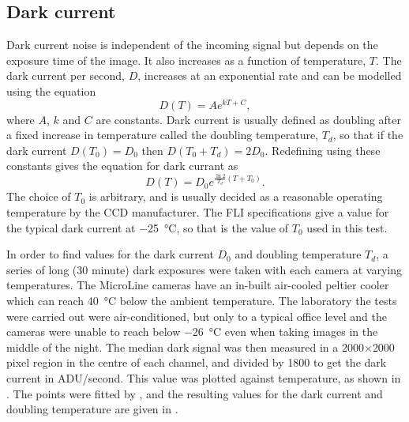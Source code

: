 \subsection{Dark current}
\label{sec:dc}
\begin{colsection}

Dark current noise is independent of the incoming signal but depends on the exposure time of the image. It also increases as a function of temperature, $T$. The dark current per second, $D$, increases at an exponential rate and can be modelled using the equation
%
\begin{equation}
    D(T) = Ae^{kT + C},
    \label{eq:dark_model}
\end{equation}
%
where $A$, $k$ and $C$ are constants. Dark current is usually defined as doubling after a fixed increase in temperature called the doubling temperature, $T_d$, so that if the dark current $D(T_0) = D_0$ then $D(T_0 + T_d) = 2D_0$. Redefining  using these constants gives the equation for dark currant as
%
\begin{equation}
    D(T) = D_0 e^{\frac{\ln2}{T_d}(T + T_0)}.
    \label{eq:dc}
\end{equation}
%
The choice of $T_0$ is arbitrary, and is usually decided as a reasonable operating temperature by the CCD manufacturer. The FLI specifications give a value for the typical dark current at \SI{-25}{\celsius}, so that is the value of $T_0$ used in this test.

In order to find values for the dark current $D_0$ and doubling temperature $T_d$, a series of long (30 minute) dark exposures were taken with each camera at varying temperatures. The MicroLine cameras have an in-built air-cooled peltier cooler which can reach \SI{40}{\celsius} below the ambient temperature. The laboratory the tests were carried out were air-conditioned, but only to a typical office level and the cameras were unable to reach below \SI{-26}{\celsius} even when taking images in the middle of the night. The median dark signal was then measured in a 2000$\times$2000 pixel region in the centre of each channel, and divided by 1800 to get the dark current in ADU/second. This value was plotted against temperature, as shown in . The points were fitted by , and the resulting values for the dark current and doubling temperature are given in .


\end{colsection}

